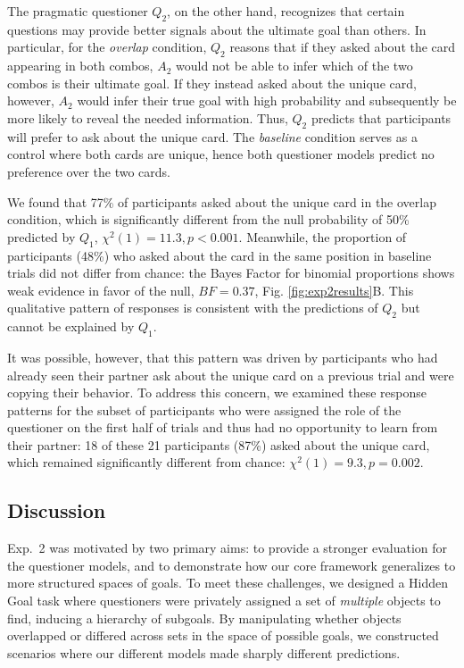 \documentclass[11pt, floatsintext]{apa6}
\begin{document}
The pragmatic questioner $Q_2$, on the other hand, recognizes that certain questions may provide better signals about the ultimate goal than others.
In particular, for the \emph{overlap} condition, $Q_2$ reasons that if they asked about the card appearing in both combos, $A_2$ would not be able to infer which of the two combos is their ultimate goal.
If they instead asked about the unique card, however, $A_2$ would infer their true goal with high probability and subsequently be more likely to reveal the needed information.
Thus, $Q_2$ predicts that participants will prefer to ask about the unique card.
The \emph{baseline} condition serves as a control where both cards are unique, hence both questioner models predict no preference over the two cards.

We found that 77\% of participants asked about the unique card in the overlap condition, which is significantly different from the null probability of 50\% predicted by $Q_1$, $\chi^2(1) = 11.3, p < 0.001$. 
Meanwhile, the proportion of participants (48\%) who asked about the card in the same position in baseline trials did not differ from chance: the Bayes Factor for binomial proportions  \cite{morey2016philosophy, morey2015package} shows weak evidence in favor of the null, $BF = 0.37$, Fig. \ref{fig:exp2results}B. 
This qualitative pattern of responses is consistent with the predictions of $Q_2$ but cannot be explained by $Q_1$.

It was possible, however, that this pattern was driven by participants who had already seen their partner ask about the unique card on a previous trial and were copying their behavior. 
To address this concern, we examined these response patterns for the subset of participants who were assigned the role of the questioner on the first half of trials and thus had no opportunity to learn from their partner: 18 of these 21 participants (87\%) asked about the unique card, which remained significantly different from chance: $\chi^2(1) = 9.3, p = 0.002$.

\subsection{Discussion}

Exp.~2 was motivated by two primary aims: to provide a stronger evaluation for the questioner models, and to demonstrate how our core framework generalizes to more structured spaces of goals.
To meet these challenges, we designed a Hidden Goal task where questioners were privately assigned a set of \emph{multiple} objects to find, inducing a hierarchy of subgoals.
By manipulating whether objects overlapped or differed across sets in the space of possible goals, we constructed scenarios where our different models made sharply different predictions. 
\end{document}
